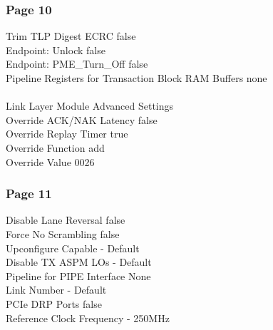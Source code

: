 \subsubsection{Page 10}
Trim TLP Digest ECRC false \\
Endpoint: Unlock false \\
Endpoint: PME\_Turn\_Off false \\
Pipeline Registers for Transaction Block RAM Buffers none  \\
\\
Link Layer Module Advanced Settings \\
Override ACK/NAK Latency false \\
Override Replay Timer true \\
Override Function add \\
Override Value 0026  \\

\subsubsection{Page 11}
Disable Lane Reversal false \\
Force No Scrambling false \\

Upconfigure Capable - Default   \\
Disable TX ASPM LOs - Default  \\

Pipeline for PIPE Interface None \\
Link Number - Default \\
PCIe DRP Ports false \\

Reference Clock Frequency - 250MHz  \\


